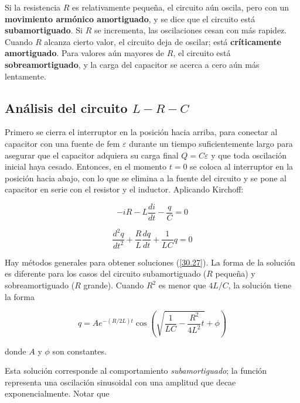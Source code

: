 Si la resistencia $R$ es relativamente pequeña, el circuito aún oscila, pero con un \textbf{movimiento armónico amortiguado}, y se dice que el circuito está \textbf{subamortiguado}. Si $R$ se incrementa, las oscilaciones cesan con más rapidez. Cuando $R$ alcanza cierto valor, el circuito deja de oscilar; está \textbf{críticamente amortiguado}. Para valores aún mayores de $R$, el circuito está \textbf{sobreamortiguado}, y la carga del capacitor se acerca a cero aún más lentamente.

\subsection{Análisis del circuito $L-R-C$}
Primero se cierra el interruptor en la posición hacia arriba, para conectar al capacitor con una fuente de fem $\varepsilon$ durante un tiempo suficientemente largo para asegurar que el capacitor adquiera su carga final $Q=C\varepsilon$ y que toda oscilación inicial haya cesado. Entonces, en el momento $t=0$ se coloca al interruptor en la posición hacia abajo, con lo que se elimina a la fuente del circuito y se pone al capacitor en serie con el resistor y el inductor. Aplicando Kirchoff:

\begin{equation*}
-iR-L\frac{di}{dt}-\frac{q}{C}=0
\end{equation*}

\begin{equation}\label{30.27}
\frac{d^2q}{dt^2}+\frac{R}{L}\frac{dq}{dt}+\frac{1}{LC}q=0
\end{equation}

Hay métodos generales para obtener soluciones (\ref{30.27}). La forma de la solución es diferente para los casos del circuito subamortiguado ($R$ pequeña) y sobreamortiguado ($R$ grande). Cuando $R^2$ es menor que $4L/C$, la solución tiene la forma

\begin{equation}\label{30.28}
q=Ae^{-(R/2L)t}\cos \left(\sqrt{\frac{1}{LC}-\frac{R^2}{4L^2}t}+\phi\right)
\end{equation}

donde $A$ y $\phi$ son constantes.

Esta solución corresponde al comportamiento \textit{subamortiguado}; la función representa una oscilación sinusoidal con una amplitud que decae exponencialmente. Notar que

